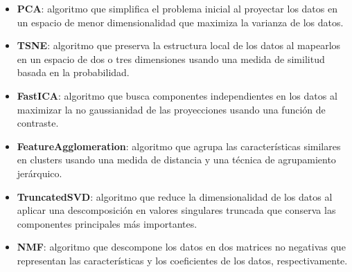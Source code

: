 \documentclass{wsdcr}
\begin{document}
\begin{itemize}
    \setlength\itemsep{0em}
    \item \textbf{PCA}: algoritmo que simplifica el problema inicial al proyectar los datos en un espacio de menor dimensionalidad que maximiza la varianza de los datos.
    \item \textbf{TSNE}: algoritmo que preserva la estructura local de los datos al mapearlos en un espacio de dos o tres dimensiones usando una medida de similitud basada en la probabilidad.
    \item \textbf{FastICA}: algoritmo que busca componentes independientes en los datos al maximizar la no gaussianidad de las proyecciones usando una función de contraste.
    \item \textbf{FeatureAgglomeration}: algoritmo que agrupa las características similares en clusters usando una medida de distancia y una técnica de agrupamiento jerárquico.
    \item \textbf{TruncatedSVD}: algoritmo que reduce la dimensionalidad de los datos al aplicar una descomposición en valores singulares truncada que conserva las componentes principales más importantes.
    \item \textbf{NMF}: algoritmo que descompone los datos en dos matrices no negativas que representan las características y los coeficientes de los datos, respectivamente.
\end{itemize}
\end{document}
